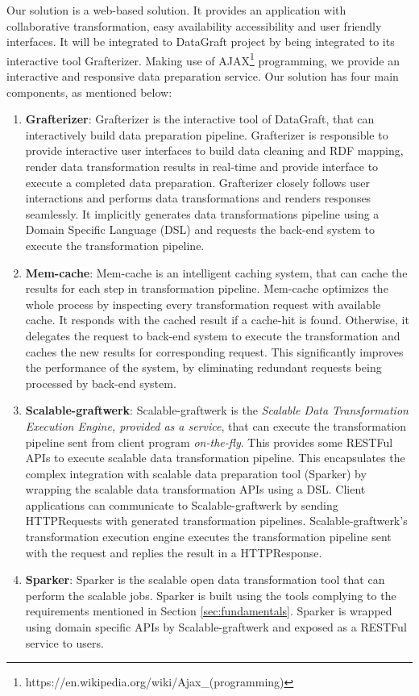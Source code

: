 Our solution is a web-based solution. It provides an application with collaborative transformation, easy availability  accessibility and user friendly interfaces. It will be integrated to DataGraft project by being integrated to its interactive tool Grafterizer. Making use of AJAX\footnote{https://en.wikipedia.org/wiki/Ajax\_(programming)} programming, we provide an interactive and responsive data preparation service. Our solution has four main components, as mentioned below:
\begin{enumerate}
\item \textbf{Grafterizer}: Grafterizer is the interactive tool of DataGraft, that can interactively build data preparation pipeline. Grafterizer is responsible to provide interactive user interfaces to build data cleaning and RDF mapping,  render data transformation results in real-time and provide interface to execute a completed data preparation. Grafterizer closely follows  user interactions and performs data transformations and renders responses seamlessly. It implicitly generates data transformations pipeline using a Domain Specific Language (DSL) and requests the back-end system to execute the transformation pipeline. 
\item \textbf{Mem-cache}: Mem-cache is an intelligent caching system, that can cache the results for each step in transformation pipeline. Mem-cache optimizes the whole process by inspecting every transformation request with available cache. It responds with the cached result if a cache-hit is found. Otherwise, it delegates the request to back-end system to execute the transformation and caches the new results for corresponding request. This significantly improves the performance of the system, by eliminating redundant requests being processed by back-end system. 
\item \textbf{Scalable-graftwerk}: Scalable-graftwerk is the \textit{Scalable Data Transformation Execution Engine, provided as a service}, that can execute the transformation pipeline sent from client program \textit{on-the-fly}. This provides some RESTFul \cite{restful} APIs to execute scalable data transformation pipeline. This encapsulates the complex integration with scalable data preparation tool (Sparker) by wrapping the scalable data transformation APIs using a DSL. Client applications can communicate to Scalable-graftwerk by sending HTTPRequests with generated transformation pipelines. Scalable-graftwerk's transformation execution engine executes the transformation pipeline sent with the request and replies the result in a HTTPResponse.  
\item \textbf{Sparker}: Sparker is the scalable open data transformation tool that can perform the scalable jobs. Sparker is built using the tools complying to the requirements mentioned in Section \ref{sec:fundamentals}. Sparker is wrapped using domain specific APIs by Scalable-graftwerk and exposed as a RESTFul service to users. 
\end{enumerate}
